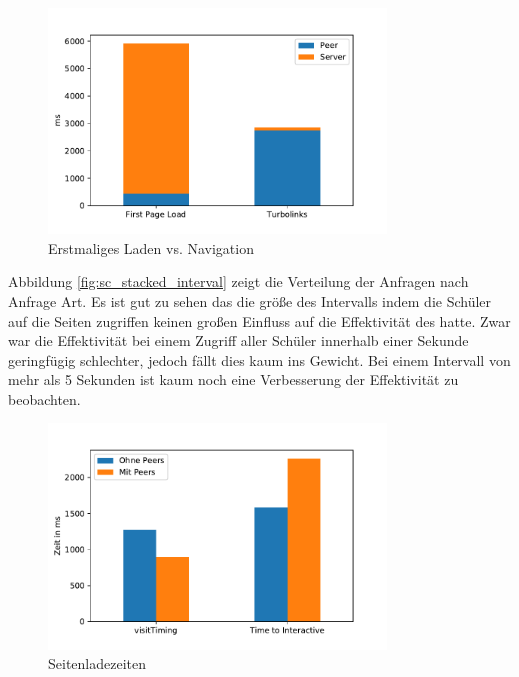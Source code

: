 \begin{figure}[!h]
	\centering
	\includegraphics[width=0.8\textwidth]{figures/sc_first_vs_later}
	\caption[A Figure Short-Title]{Erstmaliges Laden vs. Navigation}
	\label{fig:sc_first_vs_later}
\end{figure}
Abbildung \ref{fig:sc_stacked_interval} zeigt die Verteilung der Anfragen nach Anfrage Art. Es ist gut zu sehen das die größe des Intervalls indem die Schüler auf die Seiten zugriffen keinen großen Einfluss auf die Effektivität des \pTp \cdns hatte. Zwar war die Effektivität bei einem Zugriff aller Schüler innerhalb einer Sekunde geringfügig schlechter, jedoch fällt dies kaum ins Gewicht. Bei einem Intervall von mehr als 5 Sekunden ist kaum noch eine Verbesserung der Effektivität zu beobachten.
\begin{figure}[!h]
	\centering
	\includegraphics[width=0.8\textwidth]{figures/page_load_sc}
	\caption[A Figure Short-Title]{Seitenladezeiten}
	\label{fig:page_load_sc}
\end{figure}

